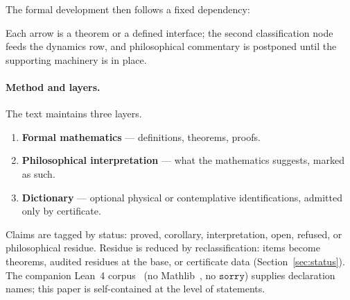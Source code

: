 \documentclass[11pt,a4paper]{article}
\theoremstyle{plain}
\theoremstyle{definition}
\theoremstyle{remark}
\begin{document}
The formal development then follows a fixed dependency:

\begin{center}
\end{center}
Each arrow is a theorem or a defined interface; the second
classification node feeds the dynamics row, and philosophical commentary
is postponed until the supporting machinery is in place.

\paragraph{Method and layers.}
The text maintains three layers.
\begin{enumerate}[label=(\arabic*)]
\item \textbf{Formal mathematics} --- definitions, theorems, proofs.
\item \textbf{Philosophical interpretation} --- what the mathematics
suggests, marked as such.
\item \textbf{Dictionary} --- optional physical or contemplative
identifications, admitted only by certificate.
\end{enumerate}
Claims are tagged by status: proved, corollary, interpretation, open,
refused, or philosophical residue. Residue is reduced by
reclassification: items become theorems, audited residues at the base,
or certificate data (Section~\ref{sec:status}). The companion Lean~4 corpus~\cite{lean4}
(no Mathlib~\cite{mathlib}, no $\mathtt{sorry}$) supplies declaration
names; this paper is
self-contained at the level of statements.
\end{document}
